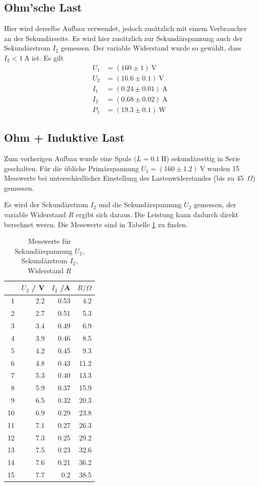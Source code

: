 \documentclass{article}
\newcommand{\W}{\text{W}}
\newcommand{\V}{\text{V}}
\newcommand{\A}{\text{A}}
\begin{document}
\subsection{Ohm'sche Last}

Hier wird derselbe Aufbau verwendet, jedoch zusätzlich mit einem Verbraucher an der Sekundärseite. Es wird hier zusätzlich zur Sekundärspannung auch der Sekundärstrom $I_2$ gemessen. Der variable Widerstand wurde so gewählt, dass $I_2 < 1~\A$ ist. Es gilt
\begin{align*}
U_1 &= (160 \pm 1)~\V \\
U_2 &= (16.6 \pm 0.1)~\V \\
I_1 &= (0.24 \pm 0.01)~\A \\
I_2 &= (0.68 \pm 0.02)~\A \\
P_1 &= (19.3\pm0.1)~\W
\end{align*}





\subsection{Ohm + Induktive Last}

Zum vorherigen Aufbau wurde eine Spule $(L=0.1~$H) sekundärseitig in Serie geschalten. Für die übliche Primärspannung $U_1 = (160\pm1.2)~\V$ wurden 15 Messwerte bei unterschiedlicher Einstellung des Lastenwiderstandes (bis zu 45~$\Omega$) gemessen. 

Es wird der Sekundärstrom $I_2$ und die Sekundärspannung $U_2$ gemessen, der variable Widerstand $R$ ergibt sich daraus. Die Leistung kann dadurch direkt berechnet weren. Die Messwerte sind in Tabelle \ref{tab:spule} zu finden.

\begin{table}[H]
\centering
\caption{Messwerte für Sekundärspannung $U_2$, Sekundärstrom $I_2$, Widerstand $R$}
\label{tab:spule}
\begin{tabular}{r|rrr}
  &	$U_2$ / V  &	$I_2$ /A  &	$R / \Omega$\\
  \hline
1 &	2.2	&0.53	&	4.2	 \\
2 &	2.7	&0.51	&	5.3	 \\
3 &	3.4	&0.49	&	6.9   \\
4 &	3.9	&0.46	&	8.5	  \\
5 &	4.2	&0.45	&	9.3	  \\
6 &	4.8	&0.43	&	11.2	  \\
7 &	5.3	&0.40	&   13.3  \\
8 &	5.9	&0.37	&	15.9	 \\
9 &	6.5	&0.32	&	20.3	 \\
10&	6.9	&0.29	&	23.8	 \\
11&	7.1	&0.27	&	26.3	  \\
12&	7.3	&0.25	&	29.2	  \\
13&	7.5	&0.23	&	32.6	 \\
14&	7.6	&0.21	&	36.2  \\
15&	7.7	&0.2		&   38.5 
\end{tabular}

\end{table}
\end{document}
